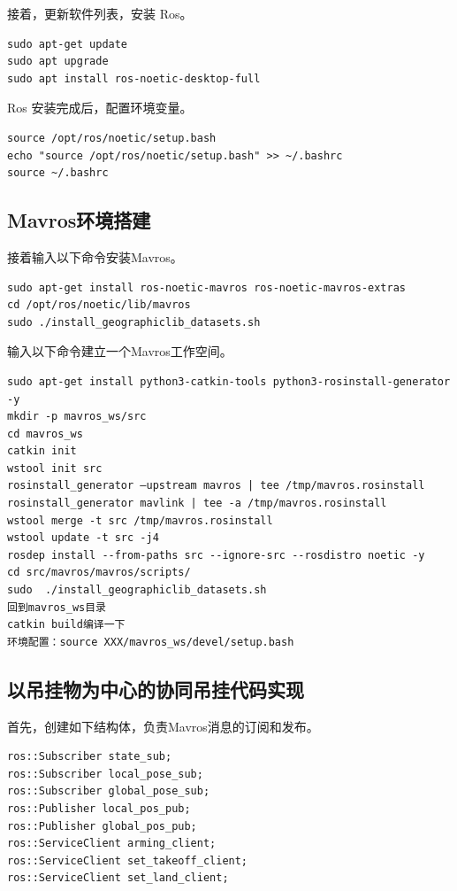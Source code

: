 接着，更新软件列表，安装 Ros。
\begin{lstlisting}[style = lstStyleBase]
sudo apt-get update
sudo apt upgrade
sudo apt install ros-noetic-desktop-full
\end{lstlisting}

Ros 安装完成后，配置环境变量。
\begin{lstlisting}[style = lstStyleBase]
source /opt/ros/noetic/setup.bash
echo "source /opt/ros/noetic/setup.bash" >> ~/.bashrc
source ~/.bashrc  
\end{lstlisting}

\subsection{Mavros环境搭建}
接着输入以下命令安装Mavros。
\begin{lstlisting}[style = lstStyleBase]
sudo apt-get install ros-noetic-mavros ros-noetic-mavros-extras
cd /opt/ros/noetic/lib/mavros
sudo ./install_geographiclib_datasets.sh
\end{lstlisting}

输入以下命令建立一个Mavros工作空间。
\begin{lstlisting}[style = lstStyleBase]
sudo apt-get install python3-catkin-tools python3-rosinstall-generator -y
mkdir -p mavros_ws/src
cd mavros_ws
catkin init
wstool init src
rosinstall_generator –upstream mavros | tee /tmp/mavros.rosinstall
rosinstall_generator mavlink | tee -a /tmp/mavros.rosinstall
wstool merge -t src /tmp/mavros.rosinstall
wstool update -t src -j4
rosdep install --from-paths src --ignore-src --rosdistro noetic -y
cd src/mavros/mavros/scripts/
sudo  ./install_geographiclib_datasets.sh
回到mavros_ws目录
catkin build编译一下
环境配置：source XXX/mavros_ws/devel/setup.bash
\end{lstlisting}

\subsection{以吊挂物为中心的协同吊挂代码实现}
首先，创建如下结构体，负责Mavros消息的订阅和发布。
\begin{lstlisting}[style = lstStyleBase]
ros::Subscriber state_sub;
ros::Subscriber local_pose_sub;
ros::Subscriber global_pose_sub;
ros::Publisher local_pos_pub;
ros::Publisher global_pos_pub;
ros::ServiceClient arming_client;
ros::ServiceClient set_takeoff_client;
ros::ServiceClient set_land_client;
\end{lstlisting}

